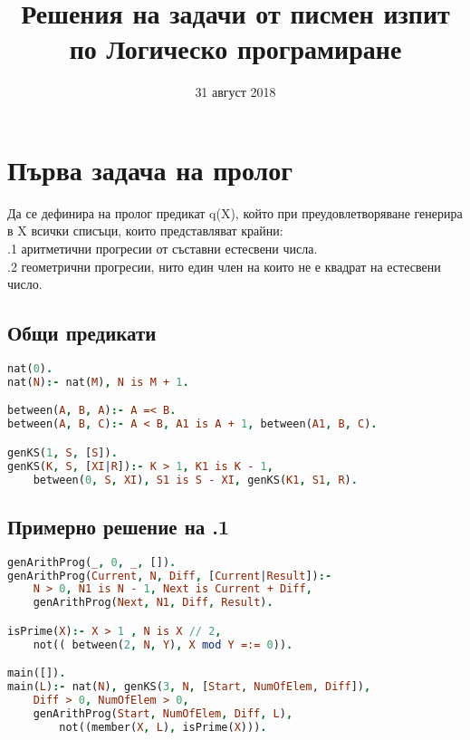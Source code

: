 \documentclass{article}
\title{Решения на задачи от писмен изпит по Логическо програмиране}
\date{31 август 2018}
\begin{document}


\maketitle %
\newpage
\tableofcontents
\newpage %
\section{Първа задача на пролог}
Да се дефинира на пролог предикат q(X), който при преудовлетворяване генерира в X всички списъци, които представляват крайни: \\
.1 аритметични прогресии от съставни естесвени числа. \\
.2 геометрични прогресии, нито един член на които не е квадрат на естесвени число.

\subsection{Общи предикати}
\begin{addmargin}[1em]{2em}
\begin{lstlisting}[language=Prolog]
nat(0).
nat(N):- nat(M), N is M + 1.

between(A, B, A):- A =< B.
between(A, B, C):- A < B, A1 is A + 1, between(A1, B, C).

genKS(1, S, [S]).
genKS(K, S, [XI|R]):- K > 1, K1 is K - 1, 
	between(0, S, XI), S1 is S - XI, genKS(K1, S1, R).
\end{lstlisting}
\end{addmargin}

\vskip 0.2in

\subsection{Примерно решение на .1} 
\begin{addmargin}[1em]{2em}
\begin{lstlisting}[language=Prolog]
genArithProg(_, 0, _, []).
genArithProg(Current, N, Diff, [Current|Result]):-
	N > 0, N1 is N - 1, Next is Current + Diff,
	genArithProg(Next, N1, Diff, Result).

isPrime(X):- X > 1 , N is X // 2, 
	not(( between(2, N, Y), X mod Y =:= 0)).

main([]).
main(L):- nat(N), genKS(3, N, [Start, NumOfElem, Diff]),
	Diff > 0, NumOfElem > 0,
	genArithProg(Start, NumOfElem, Diff, L), 
    	not((member(X, L), isPrime(X))).
\end{lstlisting}
\end{addmargin}
\end{document}
